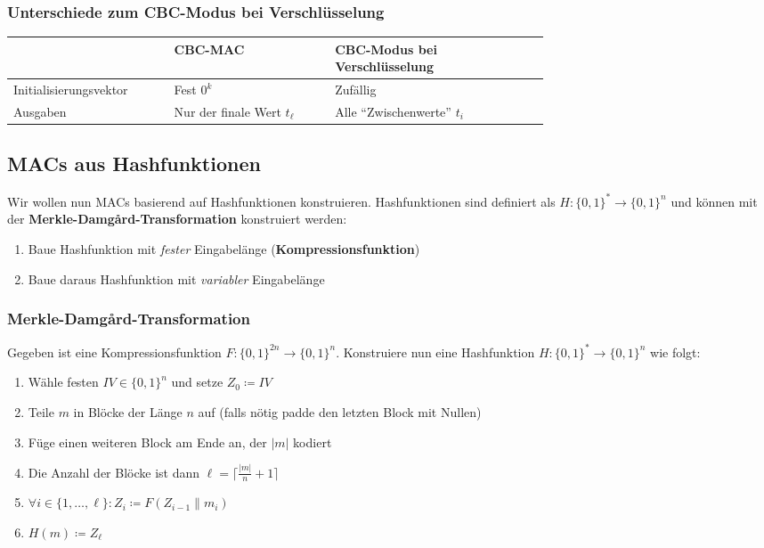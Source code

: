 \documentclass[12pt,A4]{extarticle}
\newcommand{\highlight}[1]{\textcolor{highlightColor}{\textbf{#1}}}
\begin{document}
\subsubsection{Unterschiede zum CBC-Modus bei Verschlüsselung}
\bgroup
\def\arraystretch{1.5}
\begin{table}[h]
  \begin{tabular}{|l|p{0.3\linewidth}|p{0.4\linewidth}|}
    \hline \rowcolor{gray!30}
                           & CBC-MAC                      & CBC-Modus bei Verschlüsselung \\ \hline
    Initialisierungsvektor & Fest $0^k$                   & Zufällig                      \\ \hline
    Ausgaben               & Nur der finale Wert $t_\ell$ & Alle ``Zwischenwerte'' $t_i$  \\ \hline
  \end{tabular}
\end{table}
\egroup

\subsection{MACs aus Hashfunktionen}
Wir wollen nun MACs basierend auf Hashfunktionen konstruieren. Hashfunktionen sind definiert als $H: {\{0,1\}}^* \rightarrow {\{0,1\}}^n$ und können mit der \highlight{Merkle-Damgård-Transformation} konstruiert werden:
\begin{enumerate}
  \item{Baue Hashfunktion mit \textit{fester} Eingabelänge (\textbf{Kompressionsfunktion})}
  \item{Baue daraus Hashfunktion mit \textit{variabler} Eingabelänge}
\end{enumerate}

\subsubsection{Merkle-Damgård-Transformation}
Gegeben ist eine Kompressionsfunktion $F: {\{0,1\}}^{2n} \rightarrow {\{0,1\}}^n$. Konstruiere nun eine Hashfunktion $H: {\{0,1\}}^* \rightarrow {\{0,1\}}^n$ wie folgt:
\begin{enumerate}
  \item{Wähle festen $IV \in {\{0,1\}}^n$ und setze $Z_0 \coloneqq IV$}
  \item{Teile $m$ in Blöcke der Länge $n$ auf (falls nötig padde den letzten Block mit Nullen)}
  \item{Füge einen weiteren Block am Ende an, der $|m|$ kodiert}
  \item{Die Anzahl der Blöcke ist dann $\ell = \lceil \frac{|m|}{n} + 1 \rceil$}
  \item{$\forall i \in \{1, \dots, \ell\}: Z_i \coloneqq F(Z_{i-1} \parallel m_i)$}
  \item{$H(m) \coloneqq Z_\ell$}
\end{enumerate}
\end{document}
